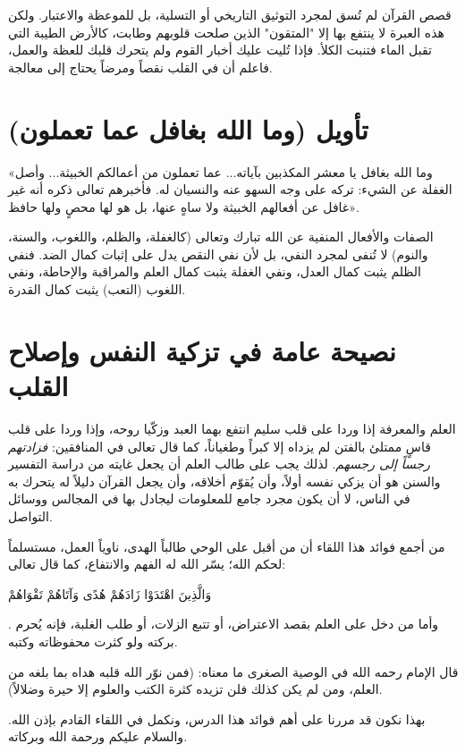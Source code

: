 \begin{fawaid}
قصص القرآن لم تُسق لمجرد التوثيق التاريخي أو التسلية، بل للموعظة والاعتبار. ولكن هذه العبرة لا ينتفع بها إلا "المتقون" الذين صلحت قلوبهم وطابت، كالأرض الطيبة التي تقبل الماء فتنبت الكلأ. فإذا تُليت عليك أخبار القوم ولم يتحرك قلبك للعظة والعمل، فاعلم أن في القلب نقصاً ومرضاً يحتاج إلى معالجة.
\end{fawaid}

\separator

\section{تأويل (وما الله بغافل عما تعملون)}
 «وما الله بغافل يا معشر المكذبين بآياته... عما تعملون من أعمالكم الخبيثة... وأصل الغفلة عن الشيء: تركه على وجه السهو عنه والنسيان له. فأخبرهم تعالى ذكره أنه غير غافل عن أفعالهم الخبيثة ولا ساهٍ عنها، بل هو لها محصٍ ولها حافظ».

\begin{fawaid}
الصفات والأفعال المنفية عن الله تبارك وتعالى (كالغفلة، والظلم، واللغوب، والسنة، والنوم) لا تُنفى لمجرد النفي، بل لأن نفي النقص يدل على إثبات كمال الضد. فنفي الظلم يثبت كمال العدل، ونفي الغفلة يثبت كمال العلم والمراقبة والإحاطة، ونفي اللغوب (التعب) يثبت كمال القدرة.
\end{fawaid}

\separator

\section{نصيحة عامة في تزكية النفس وإصلاح القلب}
العلم والمعرفة إذا وردا على قلب سليم انتفع بهما العبد وزكّيا روحه، وإذا وردا على قلب قاسٍ ممتلئ بالفتن لم يزداه إلا كبراً وطغياناً، كما قال تعالى في المنافقين: \textit{فزادتهم رجساً إلى رجسهم}. 
لذلك يجب على طالب العلم أن يجعل غايته من دراسة التفسير والسنن هو أن يزكي نفسه أولاً، وأن يُقوّم أخلاقه، وأن يجعل القرآن دليلاً له يتحرك به في الناس، لا أن يكون مجرد جامع للمعلومات ليجادل بها في المجالس ووسائل التواصل. 

\begin{fawaid}
من أجمع فوائد هذا اللقاء أن من أقبل على الوحي طالباً الهدى، ناوياً العمل، مستسلماً لحكم الله؛ يسّر الله له الفهم والانتفاع، كما قال تعالى: \begin{ayah}وَالَّذِينَ اهْتَدَوْا زَادَهُمْ هُدًى وَآتَاهُمْ تَقْوَاهُمْ\end{ayah}. وأما من دخل على العلم بقصد الاعتراض، أو تتبع الزلات، أو طلب الغلبة، فإنه يُحرم بركته ولو كثرت محفوظاته وكتبه.
\end{fawaid}

قال الإمام  رحمه الله في الوصية الصغرى ما معناه: (فمن نوّر الله قلبه هداه بما بلغه من العلم، ومن لم يكن كذلك فلن تزيده كثرة الكتب والعلوم إلا حيرة وضلالاً).

بهذا نكون قد مررنا على أهم فوائد هذا الدرس، ونكمل في اللقاء القادم بإذن الله. والسلام عليكم ورحمة الله وبركاته.
